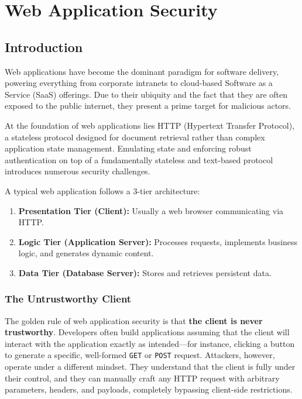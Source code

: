 \chapter{Web Application Security}

\section{Introduction}
Web applications have become the dominant paradigm for software delivery, powering everything from corporate intranets to cloud-based Software as a Service (SaaS) offerings. Due to their ubiquity and the fact that they are often exposed to the public internet, they present a prime target for malicious actors.

At the foundation of web applications lies HTTP (Hypertext Transfer Protocol), a stateless protocol designed for document retrieval rather than complex application state management. Emulating state and enforcing robust authentication on top of a fundamentally stateless and text-based protocol introduces numerous security challenges. 

A typical web application follows a 3-tier architecture:
\begin{enumerate}
    \item \textbf{Presentation Tier (Client):} Usually a web browser communicating via HTTP.
    \item \textbf{Logic Tier (Application Server):} Processes requests, implements business logic, and generates dynamic content.
    \item \textbf{Data Tier (Database Server):} Stores and retrieves persistent data.
\end{enumerate}

\subsection{The Untrustworthy Client}
The golden rule of web application security is that \textbf{the client is never trustworthy}. 
Developers often build applications assuming that the client will interact with the application exactly as intended---for instance, clicking a button to generate a specific, well-formed \texttt{GET} or \texttt{POST} request. Attackers, however, operate under a different mindset. They understand that the client is fully under their control, and they can manually craft any HTTP request with arbitrary parameters, headers, and payloads, completely bypassing client-side restrictions.

